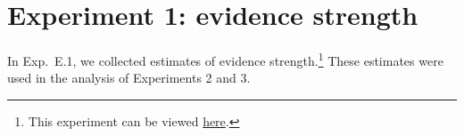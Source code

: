 \documentclass[11pt]{article}
\begin{document}
%
%
%
%

\section{Experiment 1: evidence strength}

In Exp.~E.1, we collected estimates of evidence strength.\footnote{This experiment can be viewed \href{https://web.stanford.edu/~justinek/modals_exp/evidence.html}{here}.} These estimates were used in the analysis of Experiments 2 and 3.
\end{document}
